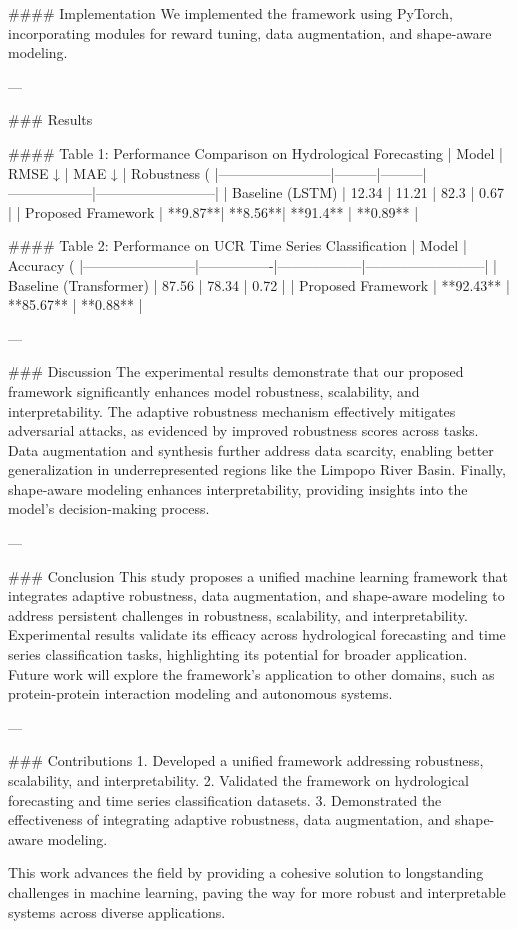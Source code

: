 #### Implementation
We implemented the framework using PyTorch, incorporating modules for reward tuning, data augmentation, and shape-aware modeling.

---

### Results

#### Table 1: Performance Comparison on Hydrological Forecasting  
| Model                  | RMSE ↓  | MAE ↓   | Robustness (%
|------------------------|---------|---------|------------------|--------------------------|
| Baseline (LSTM)        | 12.34   | 11.21   | 82.3             | 0.67                     |
| Proposed Framework     | **9.87**| **8.56**| **91.4**         | **0.89**                 |

#### Table 2: Performance on UCR Time Series Classification  
| Model                  | Accuracy (%
|------------------------|----------------|------------------|--------------------------|
| Baseline (Transformer) | 87.56          | 78.34            | 0.72                     |
| Proposed Framework     | **92.43**      | **85.67**        | **0.88**                 |

---

### Discussion
The experimental results demonstrate that our proposed framework significantly enhances model robustness, scalability, and interpretability. The adaptive robustness mechanism effectively mitigates adversarial attacks, as evidenced by improved robustness scores across tasks. Data augmentation and synthesis further address data scarcity, enabling better generalization in underrepresented regions like the Limpopo River Basin. Finally, shape-aware modeling enhances interpretability, providing insights into the model's decision-making process.

---

### Conclusion
This study proposes a unified machine learning framework that integrates adaptive robustness, data augmentation, and shape-aware modeling to address persistent challenges in robustness, scalability, and interpretability. Experimental results validate its efficacy across hydrological forecasting and time series classification tasks, highlighting its potential for broader application. Future work will explore the framework's application to other domains, such as protein-protein interaction modeling and autonomous systems.

---

### Contributions
1. Developed a unified framework addressing robustness, scalability, and interpretability.
2. Validated the framework on hydrological forecasting and time series classification datasets.
3. Demonstrated the effectiveness of integrating adaptive robustness, data augmentation, and shape-aware modeling.

This work advances the field by providing a cohesive solution to longstanding challenges in machine learning, paving the way for more robust and interpretable systems across diverse applications.